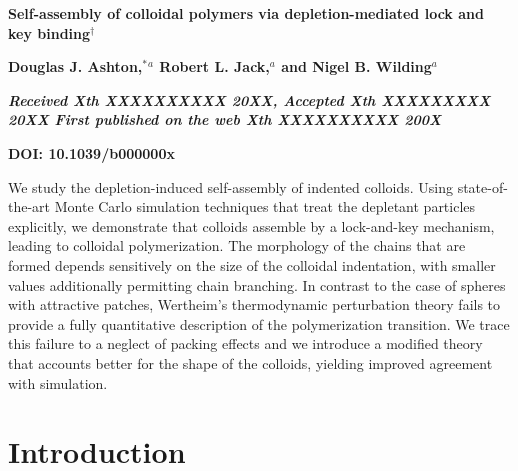 \documentclass[8.5pt,oneside,onecolumn]{article}
\begin{document}
  \begin{@twocolumnfalse}
\noindent\LARGE{\textbf{Self-assembly of colloidal polymers via depletion-mediated lock and key binding$^\dag$}}
\vspace{0.6cm}

\noindent\large{\textbf{Douglas J. Ashton,$^{\ast}$\textit{$^{a}$} Robert L. Jack,\textit{$^{a}$} and
Nigel B. Wilding\textit{$^{a}$}}}\vspace{0.5cm}

\noindent\textit{\small{\textbf{Received Xth XXXXXXXXXX 20XX, Accepted Xth XXXXXXXXX 20XX\newline
First published on the web Xth XXXXXXXXXX 200X}}}

\noindent \textbf{\small{DOI: 10.1039/b000000x}}
\vspace{0.6cm}

\noindent \normalsize{We study the depletion-induced self-assembly of indented colloids.
Using state-of-the-art Monte Carlo simulation techniques that treat
the depletant particles explicitly, we demonstrate that colloids assemble by a
lock-and-key mechanism, leading to colloidal polymerization. 
The morphology
of the chains that are formed depends sensitively on the size of the
colloidal indentation, with smaller values additionally permitting
chain branching.  In contrast to the case of spheres with attractive
patches, Wertheim's thermodynamic perturbation theory fails to provide a fully
quantitative description of the polymerization transition.  We trace
this failure to a neglect of packing effects and we introduce a modified theory
that accounts better for the shape of the colloids, yielding improved
agreement with simulation.
}

\vspace{0.5cm}
 \end{@twocolumnfalse}
  

\newcommand{\vfs}{\eta_s^r}



\section{Introduction} \label{sec:intro}
\end{document}
